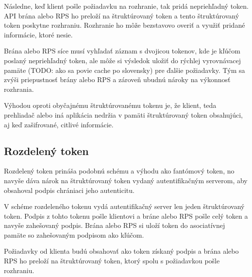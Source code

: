 Následne, keď klient pošle požiadavku na rozhranie, tak pridá nepriehľadný token. API brána alebo RPS ho preloží na štruktúrovaný token a tento štruktúrovaný token poskytne rozhraniu. Rozhranie ho môže bezstavovo overiť a využiť pridané informácie, ktoré nesie.

Brána alebo RPS síce musí vyhľadať záznam s dvojicou tokenov, kde je kľúčom poslaný nepriehľadný token, ale môže si výsledok uložiť do rýchlej vyrovnávacej pamäte (TODO: ako sa povie cache po slovensky) pre ďalšie požiadavky. Tým sa zvýši priepustnosť brány alebo RPS a zároveň ubudnú nároky na výkonnosť rozhrania.

Výhodou oproti obyčajnému štruktúrovanému tokenu je, že klient, teda prehliadač alebo iná aplikácia nedržia v pamäti štruktúrovaný token obsahujúci, aj keď zašifrované, citlivé informácie.


\subsection{Rozdelený token}

Rozdelený token prináša podobnú schému a výhodu ako fantómový token, no navyše dáva nárok na štruktúrovaný token vydaný autentifikačným serverom, aby obsahoval podpis chrániaci jeho autenticitu.

V schéme rozdeleného tokenu vydá autentifikačný server len jeden štruktúrovaný token. Podpis z tohto tokenu pošle klientovi a bráne alebo RPS pošle celý token a navyše zahešovaný podpis. Brána alebo RPS si uloží token do asociatívnej pamäte so zahešovaným podpisom ako kľúčom.

Požiadavky od klienta budú obsahovať ako token získaný podpis a brána alebo RPS ho preloží na štruktúrovaný token, ktorý spolu s požiadavkou pošle rozhraniu.